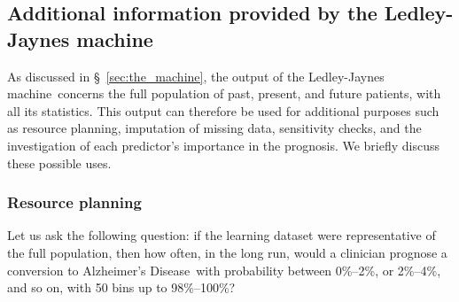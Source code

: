 \documentclass[utf8]{FrontiersinHarvard} %
\newcommand*{\sect}{\S}%
\renewcommand*{\|}[1][]{\nonscript\:#1\vert\nonscript\:\mathopen{}}
\newcommand*{\ad}{Alzheimer's Disease}
\newcommand*{\ljm}{Ledley-Jaynes machine}
\begin{document}
\bigskip%
\subsection{Additional information provided by the \ljm}
\label{sec:additional_results}

As discussed in \sect~\ref{sec:the_machine}, the output of the \ljm\ concerns the full population of past, present, and future patients, with all its statistics. This output can therefore be used for additional purposes such as resource planning, imputation of missing data, sensitivity checks, and the investigation of each predictor's importance in the prognosis. We briefly discuss these possible uses.

\subsubsection{Resource planning}
\label{sec:resource_planning}

Let us ask the following question: if the learning dataset were representative of the full population, then how often, in the long run, would a clinician prognose a conversion to \ad\ with probability between 0\%--2\%, or 2\%--4\%, and so on, with 50 bins up to 98\%--100\%?
\end{document}
